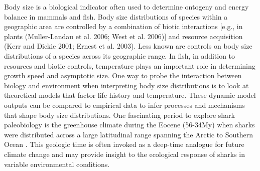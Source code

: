\documentclass[]{rsos}%
\begin{document}
Body size is a biological indicator often used to determine ontogeny and energy balance in mammals and fish. 
Body size distributions of species within a geographic area are controlled by a combination of biotic interactions [e.g., in plants (Muller-Landau et al. 2006; West et al. 2006)] and resource acquisition (Kerr and Dickie 2001; Ernest et al. 2003).
Less known are controls on body size distributions of a species across its geographic range.
In fish, in addition to resources and biotic controls, temperature plays an important role in determining growth speed and asymptotic size. 
One way to probe the interaction between biology and environment when interpreting  body size distributions is to look at theoretical models that factor life history and temperature.
These dynamic model outputs can be compared to empirical data to infer processes and mechanisms that shape body size distributions.
One fascinating period to explore shark paleobiology is the greenhouse climate during the Eocene (56-34My) when sharks were distributed across a large latitudinal range spanning the Arctic \cite{Eberle2012, fieman2016comparing} to Southern Ocean \cite{Long1992, Kriwet2016}.
This geologic time is often invoked as a deep-time analogue for future climate change and may provide insight to the ecological response of sharks in variable environmental conditions.  
\end{document}

